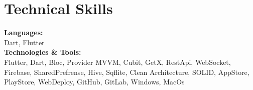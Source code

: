\documentclass[a4paper,8pt]{article}
\begin{document}

\section{Technical Skills}
\color[HTML]{1C033C}\textbf{Languages:} \\[2pt]
\color[HTML]{371e77} \hspace*{4ex} Dart, Flutter\\[3pt]
\color[HTML]{1C033C}\textbf{Technologies \& Tools:} \\[2pt]
\color[HTML]{371e77} \hspace*{4ex} Flutter, Dart, Bloc, Provider MVVM, Cubit, GetX, RestApi, WebSocket, Firebase, SharedPrefrense, Hive, Sqflite, Clean Architecture, SOLID, AppStore, PlayStore, WebDeploy, GitHub, GitLab, Windows, MacOs\\[3pt]

\end{document}
